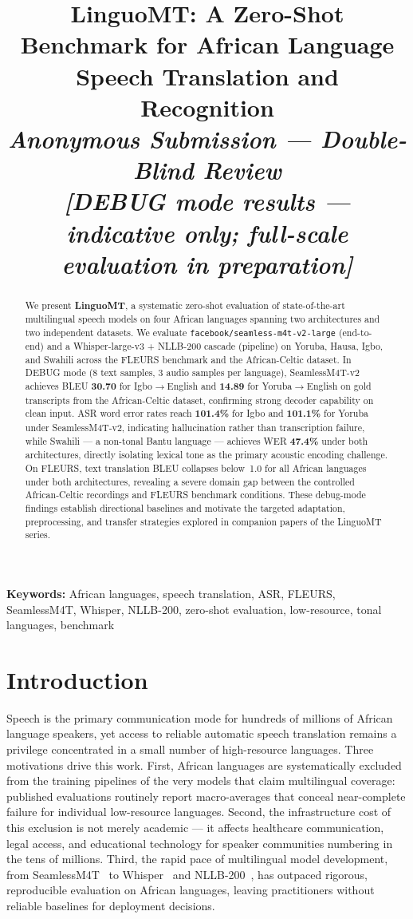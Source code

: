 \documentclass[10pt,twocolumn]{article}
\title{
  \large \textbf{LinguoMT: A Zero-Shot Benchmark for African Language\\[0.2em]
  Speech Translation and Recognition}\\[0.5em]
  \normalsize \textit{Anonymous Submission --- Double-Blind Review}\\[0.3em]
  \small \textit{[DEBUG mode results --- indicative only; full-scale evaluation in preparation]}
}
\author{}
\date{}
\begin{document}
\maketitle
\thispagestyle{empty}

\begin{abstract}
We present \textbf{LinguoMT}, a systematic zero-shot evaluation of
state-of-the-art multilingual speech models on four African languages
spanning two architectures and two independent datasets.
We evaluate \texttt{facebook/seamless-m4t-v2-large} (end-to-end)
and a Whisper-large-v3 + NLLB-200 cascade (pipeline) on Yoruba,
Hausa, Igbo, and Swahili across the FLEURS benchmark and the
African-Celtic dataset.
In DEBUG mode (8 text samples, 3 audio samples per language),
SeamlessM4T-v2 achieves BLEU \textbf{30.70} for Igbo$\rightarrow$English
and \textbf{14.89} for Yoruba$\rightarrow$English on gold transcripts
from the African-Celtic dataset, confirming strong decoder capability
on clean input.
ASR word error rates reach \textbf{101.4\%} for Igbo and
\textbf{101.1\%} for Yoruba under SeamlessM4T-v2, indicating
hallucination rather than transcription failure, while Swahili ---
a non-tonal Bantu language --- achieves WER \textbf{47.4\%} under
both architectures, directly isolating lexical tone as the primary
acoustic encoding challenge.
On FLEURS, text translation BLEU collapses below~1.0 for all
African languages under both architectures, revealing a severe
domain gap between the controlled African-Celtic recordings and
FLEURS benchmark conditions.
These debug-mode findings establish directional baselines and
motivate the targeted adaptation, preprocessing, and transfer
strategies explored in companion papers of the LinguoMT series.
\end{abstract}

\textbf{Keywords:} African languages, speech translation, ASR,
FLEURS, SeamlessM4T, Whisper, NLLB-200, zero-shot evaluation,
low-resource, tonal languages, benchmark

\section{Introduction}

Speech is the primary communication mode for hundreds of millions
of African language speakers, yet access to reliable automatic
speech translation remains a privilege concentrated in a small
number of high-resource languages.
Three motivations drive this work.
First, African languages are systematically excluded from the
training pipelines of the very models that claim multilingual
coverage: published evaluations routinely report macro-averages
that conceal near-complete failure for individual low-resource
languages.
Second, the infrastructure cost of this exclusion is not merely
academic --- it affects healthcare communication, legal access,
and educational technology for speaker communities numbering in
the tens of millions.
Third, the rapid pace of multilingual model development, from
SeamlessM4T~\cite{barrault2023seamless} to
Whisper~\cite{radford2022whisper} and NLLB-200~\cite{nllb2022},
has outpaced rigorous, reproducible evaluation on African languages,
leaving practitioners without reliable baselines for deployment decisions.
\end{document}
